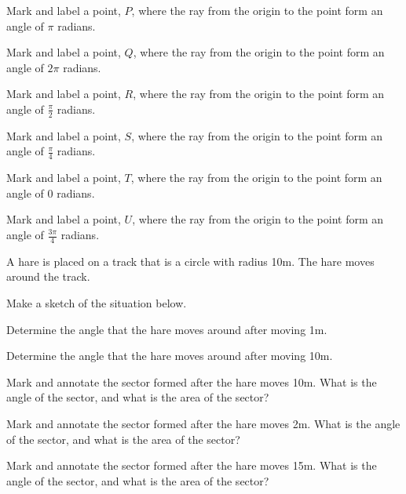\begin{problem}
  \begin{subproblem}
  \item Mark and label a point, $P$, where the ray from the origin to
    the point form an angle of $\pi$ radians.
  \item Mark and label a point, $Q$, where the ray from the origin to
    the point form an angle of $2\pi$ radians.
  \item Mark and label a point, $R$, where the ray from the origin to
    the point form an angle of $\frac{\pi}{2}$ radians.
  \item Mark and label a point, $S$, where the ray from the origin to
    the point form an angle of $\frac{\pi}{4}$ radians.
  \item Mark and label a point, $T$, where the ray from the origin to
    the point form an angle of $0$ radians.
  \item Mark and label a point, $U$, where the ray from the origin to
    the point form an angle of $\frac{3\pi}{4}$ radians.
  \end{subproblem}

  \clearpage

\item A hare is placed on a track that is a circle with radius
  10m. The hare moves around the track.
  \begin{subproblem}
  \item Make a sketch of the situation below.
    \vfill

  \item Determine the angle that the hare moves around after moving
    1m.   
    \vfill

  \item Determine the angle that the hare moves around after moving 10m.
    \vfill

  \item Mark and annotate the sector formed after the hare moves
    10m. What is the angle of the sector, and what is the area of the
    sector?
    \vfill

  \item Mark and annotate the sector formed after the hare moves
    2m. What is the angle of the sector, and what is the area of the
    sector?
    \vfill
  \item Mark and annotate the sector formed after the hare moves
    15m. What is the angle of the sector, and what is the area of the
    sector?
    \vfill
  \end{subproblem}


\end{problem}
